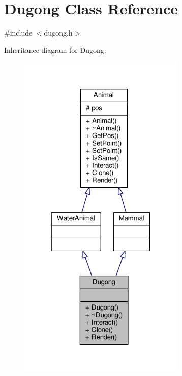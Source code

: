 \hypertarget{classDugong}{}\section{Dugong Class Reference}
\label{classDugong}


{\ttfamily \#include $<$dugong.\+h$>$}



Inheritance diagram for Dugong\+:
\nopagebreak
\begin{figure}[H]
\begin{center}
\leavevmode
\includegraphics[width=226pt]{classDugong__inherit__graph}
\end{center}
\end{figure}


